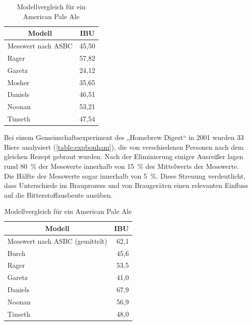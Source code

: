 \documentclass[a4paper,parskip=half]{scrartcl}
\begin{document}
\begin{table}[h]
\centering
\begin{tabular}{lr}
\toprule
\multicolumn{1}{c}{\textbf{Modell}} & \multicolumn{1}{c}{\textbf{IBU}} \\
\midrule
Messwert nach ASBC & 45,50 \\
Rager             & 57,82 \\
Garetz            & 24,12 \\
Mosher            & 35,65 \\
Daniels           & 46,51 \\
Noonan            & 53,21 \\
Tinseth           & 47,54 \\
\bottomrule
\end{tabular}
\caption{Modellvergleich für ein American Pale Ale \parencite{Hall1997}}
\label{table:exphall}
\end{table}

Bei einem Gemeinschaftsexperiment des „Homebrew Digest“ in 2001 wurden 33 Biere analysiert (\autoref{table:expbonham}), die von verschiedenen Personen nach dem gleichen Rezept gebraut wurden. Nach der Eliminierung einiger Ausreißer lagen rund 80~\% der Messwerte innerhalb von 15~\% des Mittelwerts der Messwerte. Die Hälfte der Messwerte sogar innerhalb von 5~\%. Diese Streuung verdeutlicht, dass Unterschiede im Brauprozess und von Braugeräten einen relevanten Einfluss auf die Bitterstoffausbeute ausüben. \parencite{Bonham2001}

\begin{table}[h]
\centering
\begin{tabular}{lr}
\toprule
\multicolumn{1}{c}{\textbf{Modell}} & \multicolumn{1}{c}{\textbf{IBU}} \\
\midrule
Messwert nach ASBC (gemittelt) & 62,1 \\
Burch             & 45,6 \\
Rager             & 53,5 \\
Garetz            & 41,0 \\
Daniels           & 67,9 \\
Noonan            & 56,9 \\
Tinseth           & 48,0 \\
\bottomrule
\end{tabular}
\caption{Modellvergleich für ein American Pale Ale \parencite{Bonham2001}}
\label{table:expbonham}
\end{table}
\end{document}
